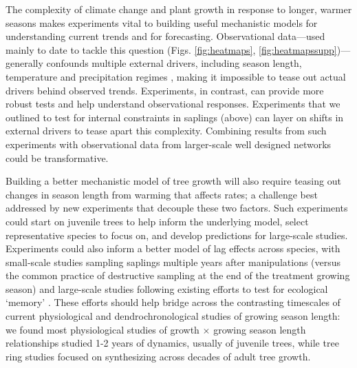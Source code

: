 \documentclass[11pt]{article}
\newcommand{\R}[1]{\label{#1}\linelabel{#1}}
\begin{document}
The complexity of climate change and plant growth in response to longer, warmer seasons makes experiments vital to building useful mechanistic models for understanding current trends and for forecasting. Observational data---used mainly to date to tackle this question (Figs. \ref{fig:heatmaps}, \ref{fig:heatmapssupp})---generally confounds multiple external drivers, including season length, temperature and precipitation regimes \citep{ren2019,ipcc2021,camarero2022decoupled}, making it impossible to tease out actual drivers behind observed trends. Experiments, in contrast, can provide more robust tests and help understand observational responses. Experiments that we outlined to test for internal constraints in saplings (above) can layer on shifts in external drivers to tease apart this complexity. Combining results from such experiments with observational data from larger-scale well designed networks \citep[see][]{schuldt2020first} could be transformative.\R{bigKextreme2} %

Building a better mechanistic model of tree growth will also require teasing out changes in season length from warming that affects rates; a challenge best addressed by new experiments that decouple these two factors. Such experiments could start on juvenile trees to help inform the underlying model, select representative species to focus on, and  develop predictions for large-scale studies. Experiments could also inform a better model of lag effects across species, with small-scale studies sampling saplings multiple years after manipulations (versus the common practice of destructive sampling at the end of the treatment growing season) and large-scale studies following existing efforts to test for ecological `memory'  \citep[e.g. ][]{flinker2021promise,schweiger2022transgenerational,chinmemory}. These efforts should help bridge across the contrasting timescales of current physiological and dendrochronological studies of growing season length: we found most physiological studies of growth $\times$ growing season length relationships studied 1-2 years of dynamics, usually of juvenile trees, while tree ring studies focused on synthesizing across decades of adult tree growth.
\end{document}
